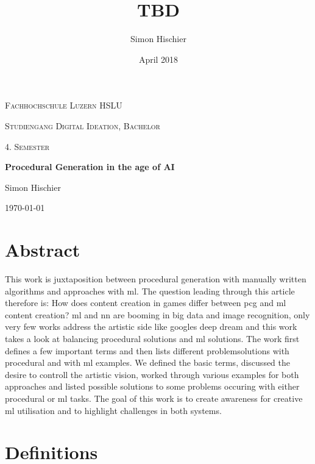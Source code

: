 \documentclass[10pt,a4paper]{article}
\title{TBD}
\author{Simon Hischier}
\date{April 2018}
\begin{document}
\begin{titlepage}
\centering
\vspace{1cm}
	{\scshape\LARGE Fachhochschule Luzern HSLU \par}
	\vspace{1cm}
	{\scshape\Large Studiengang Digital Ideation, Bachelor \par}
	
	{\scshape\Large 4. Semester\par}
	\vspace{1.5cm}
	{\huge\bf Procedural Generation in the age of AI\par}
	
	\vspace{10cm}
	{\Large Simon Hischier\par}
	\vfill

	{\large \today\par}
\end{titlepage}

\renewcommand{\contentsname}{Inhalt}
\tableofcontents
\newpage

\section{Abstract}
This work is juxtaposition between procedural generation with manually written algorithms and approaches with \gls{ml}. The question leading through this article therefore is: How does content creation in games differ between \gls{pcg} and \gls{ml} content creation? \gls{ml} and \gls{nn} are booming in big data and image recognition, only very few works address the artistic side like googles deep dream and this work takes a look at balancing procedural solutions and \gls{ml} solutions. The work first defines a few important terms and then lists different problemsolutions with procedural and with \gls{ml} examples. We defined the basic terms, discussed the desire to controll the artistic vision, worked through various examples for both approaches and listed possible solutions to some problems occuring with either procedural or \gls{ml} tasks. The goal of this work is to create awareness for creative \gls{ml} utilisation and to highlight challenges in both systems.

\section{Definitions}
\end{document}
